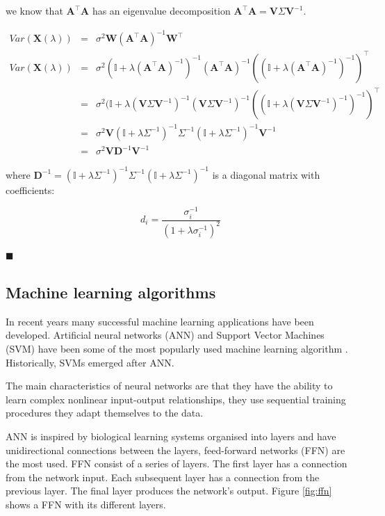 \noindent we know that $\mathbf{A}^\top
\mathbf{A}$ has an eigenvalue decomposition $\mathbf{A}^\top
\mathbf{A} = \mathbf{V} \Sigma \mathbf{V}^{-1}$.


\begin{eqnarray*}
Var(\mathbf{X}(\lambda)) &=& \sigma^2 \mathbf{W}(\mathbf{A}^\top \mathbf{A} )^{-1}\mathbf{W}^\top\\
Var(\mathbf{X}(\lambda)) &=& \sigma^2 (\mathbb{I} + \lambda (\mathbf{A}^\top
\mathbf{A})^{-1})^{-1} (\mathbf{A}^\top \mathbf{A} )^{-1}((\mathbb{I} + \lambda (\mathbf{A}^\top
\mathbf{A})^{-1})^{-1} )^\top \\
&=& \sigma^2 (\mathbb{I} + \lambda (\mathbf{V} \Sigma \mathbf{V}^{-1})^{-1} (\mathbf{V} \Sigma \mathbf{V}^{-1})^{-1}((\mathbb{I} + \lambda (\mathbf{V} \Sigma \mathbf{V}^{-1})^{-1})^{-1} )^\top \\
&=& \sigma^2 \mathbf{V} (\mathbb{I} + \lambda \Sigma^{-1})^{-1} \Sigma^{-1} (\mathbb{I} + \lambda \Sigma^{-1})^{-1}  \mathbf{V}^{-1}\\
&=& \sigma^2 \mathbf{V} \mathbf{D}^{-1} \mathbf{V}^{-1}
\end{eqnarray*}

\noindent where $\mathbf{D}^{-1}  = (\mathbb{I} + \lambda \Sigma^{-1})^{-1} \Sigma^{-1} (\mathbb{I} + \lambda \Sigma^{-1})^{-1}$ is a diagonal matrix with coefficients:

\begin{equation*}
d_i = \frac{\sigma_i^{-1}}{(1+\lambda\sigma_i^{-1})^2}
\end{equation*}

$\blacksquare$


\subsection{Machine learning algorithms}
In recent years many successful machine learning applications have been developed. Artificial neural networks (ANN) and Support Vector Machines (SVM) have been some of the most popularly used machine learning algorithm \cite{haykin1998}. Historically, SVMs emerged after ANN.

The main characteristics of neural networks are that they have the ability to learn
complex nonlinear input-output relationships, they use sequential training procedures 
they adapt themselves to the data.

ANN is inspired by biological learning systems organised into layers and have unidirectional connections between the layers, feed-forward networks  (FFN) are the most used.  FFN consist of a series of layers. The first layer has a connection from the network input. Each subsequent layer has a connection from the previous layer. The final layer produces the network's output. Figure \ref{fig:ffn} shows a FFN with its different layers.

